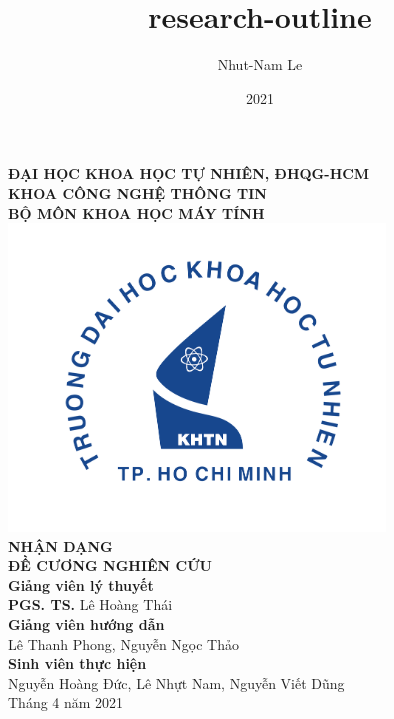 \documentclass{article}
\title{research-outline}
\author{Nhut-Nam Le}
\date{2021}
\newcommand\B{\rule[-1.2ex]{0pt}{0pt}} %
\begin{document}
	\begin{titlepage}
		\begin{center}
			\large{\textbf{ĐẠI HỌC KHOA HỌC TỰ NHIÊN, ĐHQG-HCM\\KHOA CÔNG NGHỆ THÔNG TIN\\BỘ MÔN KHOA HỌC MÁY TÍNH}}\\
			\includegraphics[width=0.75\textwidth]{images/khtn.png}\\
			\huge \textbf{NHẬN DẠNG}\\[0.1in]
			\huge \textbf{ĐỀ CƯƠNG NGHIÊN CỨU}\\[0.1in]
			\vfill
			\normalsize
			\normalsize
			\textbf{Giảng viên lý thuyết}\\
			{\textbf{PGS. TS.} Lê Hoàng Thái}\\[0.1in]
			\textbf{Giảng viên hướng dẫn}\\
			\vspace{0.1in}
			{Lê Thanh Phong, Nguyễn Ngọc Thảo}\\[0.1in]
			\textbf{Sinh viên thực hiện} \\
			\vspace{0.1in}
			{Nguyễn Hoàng Đức, Lê Nhựt Nam, Nguyễn Viết Dũng}\\[0.1in]
			\vfill
			Tháng 4 năm 2021
		\end{center}
	\end{titlepage}
	\newpage
	
	\cleardoublepage
	
	\newpage
	\tableofcontents
	\newpage
	\setcounter{secnumdepth}{0}
	
\end{document}
